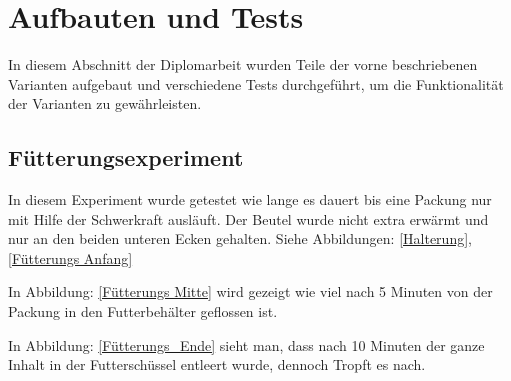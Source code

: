 \section{Aufbauten und Tests}

In diesem Abschnitt der Diplomarbeit wurden Teile der vorne beschriebenen Varianten aufgebaut und verschiedene Tests durchgeführt, um die Funktionalität der Varianten zu gewährleisten. \\

\subsection{Fütterungsexperiment} 

In diesem Experiment wurde getestet wie lange es dauert bis eine Packung nur mit Hilfe der Schwerkraft ausläuft. Der Beutel wurde nicht extra erwärmt und nur an den beiden unteren Ecken gehalten. Siehe Abbildungen: \ref{Halterung}, \ref{Fütterungs Anfang} 

In Abbildung: \ref{Fütterungs Mitte} wird gezeigt wie viel nach 5 Minuten von der Packung in den Futterbehälter geflossen ist.

In Abbildung: \ref{Fütterungs_Ende} sieht man, dass nach 10 Minuten der ganze Inhalt in der Futterschüssel entleert wurde, dennoch Tropft es nach.


